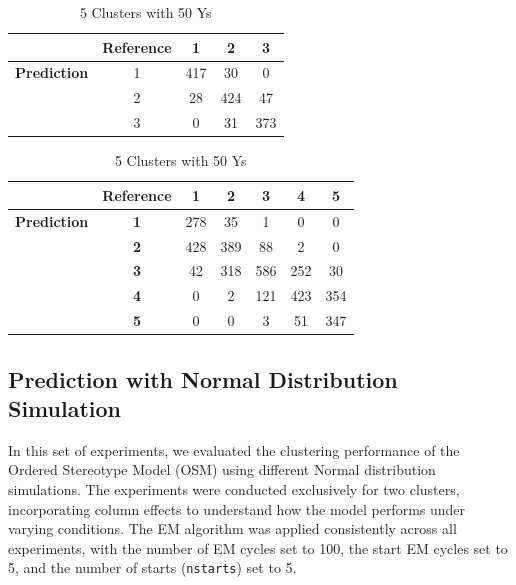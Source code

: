 \documentclass{article}
\begin{document}
\begin{table}[htbp!]
  \begin{minipage}{0.45\textwidth}
    \centering
    \begin{tabular}{c|c|c|c|c}
              & \textbf{Reference} & 1 & 2 & 3 \\
    \hline
    \textbf{Prediction} & 1 & 417 & 30 & 0 \\
                        & 2 & 28 & 424 & 47 \\
                        & 3 & 0 & 31 & 373 \\
    \end{tabular}
    \caption{3 Clusters with 50 Ys}
    \label{tab:3_clu_50}
  \end{minipage}
  \hfill
  \begin{minipage}{0.45\textwidth}
    \centering
    \begin{tabular}{c|c|c|c|c|c|c}
      & \textbf{Reference} & \textbf{1} & \textbf{2} & \textbf{3} & \textbf{4} & \textbf{5} \\
      \hline
      \textbf{Prediction} & \textbf{1} & 278 & 35 & 1 & 0 & 0 \\
                          & \textbf{2} & 428 & 389 & 88 & 2 & 0 \\
                          & \textbf{3} & 42 & 318 & 586 & 252 & 30 \\
                          & \textbf{4} & 0 & 2 & 121 & 423 & 354 \\
                          & \textbf{5} & 0 & 0 & 3 & 51 & 347 \\
    \end{tabular}
    \caption{5 Clusters with 50 Ys}
    \label{tab:5_clu_50}
  \end{minipage}

\end{table}

\clearpage

\subsection{Prediction with Normal Distribution Simulation}

In this set of experiments, we evaluated the clustering performance of the Ordered Stereotype Model (OSM) using different Normal distribution simulations. 
The experiments were conducted exclusively for two clusters, incorporating column effects to understand how the model performs under varying conditions. 
The EM algorithm was applied consistently across all experiments, with the number of EM cycles set to 100, the start EM cycles set to 5, and the number of starts (\texttt{nstarts}) set to 5.
\end{document}
